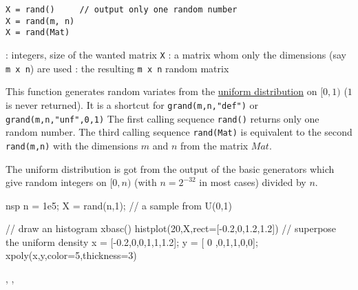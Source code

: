 \begin{mandesc}
  \short{rand}{generates random variates from the uniform distribution on [0,1)}
\end{mandesc}
\begin{calling_sequence}
\begin{verbatim}
X = rand()     // output only one random number 
X = rand(m, n)
X = rand(Mat)
\end{verbatim}
\end{calling_sequence}
\begin{parameters}
  \begin{varlist}
    : integers, size of the wanted matrix \verb!X!
   : a matrix whom only the dimensions (say \verb!m x n!) are used
   : the resulting \verb!m x n! random matrix
  \end{varlist}
  \end{parameters}
  
\begin{mandescription}
  This function generates random variates from the  \hyperlink{unfpdf}{uniform distribution} on $[0,1)$
 ($1$ is never returned). It is a shortcut for \verb+grand(m,n,"def")+ or
\verb+grand(m,n,"unf",0,1)+
  The first calling sequence \verb+rand()+ returns only one random number. The
 third calling sequence \verb+rand(Mat)+ is equivalent to the second  
 \verb+rand(m,n)+ with the dimensions $m$ and $n$ from the matrix $Mat$.

  The uniform distribution is got from the output of the basic generators which
 give random integers on $[0,n)$ (with $n = 2^{-32}$ in most cases) divided by $n$.
 
\end{mandescription}

\begin{examples}
\begin{mintednsp}{nsp}
n = 1e5;
X = rand(n,1);  // a sample from U(0,1)

// draw an histogram
xbasc()
histplot(20,X,rect=[-0.2,0,1.2,1.2])
// superpose the uniform density
x = [-0.2,0,0,1,1,1.2];
y = [ 0  ,0,1,1,0,0];
xpoly(x,y,color=5,thickness=3)
\end{mintednsp}
\end{examples}

\begin{manseealso}
  , ,    
\end{manseealso}




